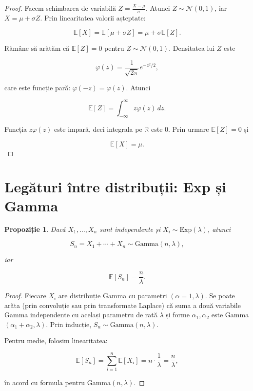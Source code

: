 \documentclass[12pt]{article}
\theoremstyle{plain}
\newtheorem{proposition}{Propoziție}
\begin{document}
\begin{proof}
Facem schimbarea de variabilă $Z = \frac{X-\mu}{\sigma}$.
Atunci $Z \sim \mathcal{N}(0,1)$, iar $X = \mu + \sigma Z$.
Prin linearitatea valorii așteptate:


\[
\mathbb{E}[X] = \mathbb{E}[\mu + \sigma Z]
= \mu + \sigma \mathbb{E}[Z].
\]


Rămâne să arătăm că $\mathbb{E}[Z]=0$ pentru $Z\sim\mathcal{N}(0,1)$.
Densitatea lui $Z$ este


\[
\varphi(z) = \frac{1}{\sqrt{2\pi}} e^{-z^2/2},
\]


care este funcție pară: $\varphi(-z)=\varphi(z)$.
Atunci


\[
\mathbb{E}[Z] = \int_{-\infty}^{\infty} z \varphi(z)\, dz.
\]


Funcția $z\varphi(z)$ este impară, deci integrala pe $\mathbb{R}$ este $0$.
Prin urmare $\mathbb{E}[Z]=0$ și


\[
\mathbb{E}[X] = \mu.
\]


\end{proof}

\section{Legături între distribuții: Exp și Gamma}

\begin{proposition}
Dacă $X_1,\dots,X_n$ sunt independente și $X_i \sim \mathrm{Exp}(\lambda)$,
atunci


\[
S_n = X_1 + \cdots + X_n \sim \mathrm{Gamma}(n,\lambda),
\]


iar


\[
\mathbb{E}[S_n] = \frac{n}{\lambda}.
\]


\end{proposition}

\begin{proof}
Fiecare $X_i$ are distribuție Gamma cu parametri $(\alpha=1,\lambda)$.
Se poate arăta (prin convoluție sau prin transformate Laplace) că suma a două variabile
Gamma independente cu același parametru de rată $\lambda$ și forme $\alpha_1,\alpha_2$
este Gamma$(\alpha_1+\alpha_2,\lambda)$.
Prin inducție, $S_n \sim \mathrm{Gamma}(n,\lambda)$.

Pentru medie, folosim linearitatea:


\[
\mathbb{E}[S_n] = \sum_{i=1}^n \mathbb{E}[X_i]
= n \cdot \frac{1}{\lambda} = \frac{n}{\lambda},
\]


în acord cu formula pentru Gamma$(n,\lambda)$.
\end{proof}
\end{document}
